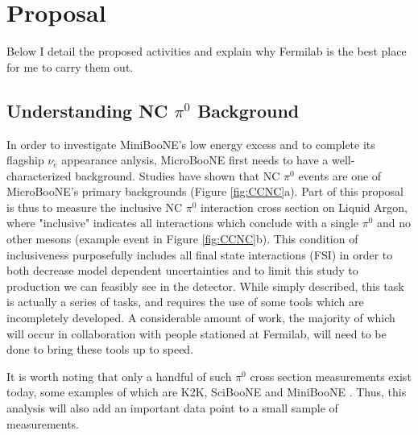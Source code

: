 \documentclass[12pt]{article}
\begin{document}




\section{Proposal}
Below I detail the proposed activities and explain why Fermilab is the best place for me to carry them out. 
\subsection{Understanding NC $\pi^0$ Background}

In order to investigate MiniBooNE's low energy excess and to complete its flagship $\nu_e$ appearance anlysis, MicroBooNE first needs to have a well-characterized background. Studies have shown \cite{sbnd} that NC $\pi^0$ events are one of MicroBooNE's primary backgrounds (Figure \ref{fig:CCNC}a). Part of this proposal is thus to measure the inclusive NC $\pi^0$ interaction cross section on Liquid Argon, where "inclusive" indicates all interactions which conclude with a single $\pi^0$ and no other mesons (example event in Figure \ref{fig:CCNC}b). This condition of inclusiveness purposefully includes all final state interactions (FSI) in order to both decrease model dependent uncertainties and to limit this study to production we can feasibly see in the detector. While simply described, this task is actually a series of tasks, and requires the use of some tools which are incompletely developed. A considerable amount of work, the majority of which will occur in collaboration with people stationed at Fermilab, will need to be done to bring these tools up to speed.
\par \vspace{3 mm}It is worth noting that only a handful of such $\pi^0$ cross section measurements exist today, some examples of which are K2K, SciBooNE and MiniBooNE \cite{k2k}\cite{sciboone}\cite{anderson}. Thus, this analysis will also add an important data point to a small sample of measurements. 
\end{document}
